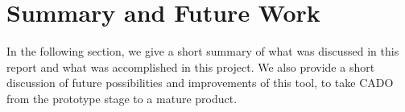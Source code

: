 \chapter{Summary and Future Work}
In the following section, we give a short summary of what was discussed in this report and what was accomplished in this project. We also provide a short discussion of future possibilities and improvements of this tool, to take CADO from the prototype stage to a mature product.




